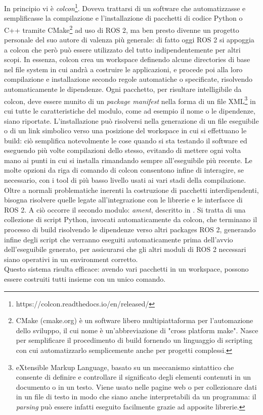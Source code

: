 In principio vi è \emph{colcon}\footnote{https://colcon.readthedocs.io/en/released/}. Doveva trattarsi di un software che automatizzasse e semplificasse la compilazione e l'installazione di pacchetti di codice Python o C++ tramite CMake\footnote{CMake (cmake.org) è un software libero multipiattaforma per l'automazione dello sviluppo, il cui nome è un'abbreviazione di "cross platform make". Nasce per semplificare il procedimento di build fornendo un linguaggio di scripting con cui automatizzarlo semplicemente anche per progetti complessi.} ad uso di ROS 2, ma ben presto divenne un progetto personale del suo autore di valenza più generale: di fatto oggi ROS 2 si appoggia a colcon che però può essere utilizzato del tutto indipendentemente per altri scopi. In essenza, colcon crea un workspace definendo alcune directories di base nel file system in cui andrà a costruire le applicazioni, e procede poi alla loro compilazione e installazione secondo regole automatiche o specificate, risolvendo automaticamente le dipendenze. Ogni pacchetto, per risultare intelligibile da colcon, deve essere munito di un \emph{package manifest} nella forma di un file XML\footnote{eXtensible Markup Language, basato su un meccanismo sintattico che consente di definire e controllare il significato degli elementi contenuti in un documento o in un testo. Viene usato nelle pagine web o per collezionare dati in un file di testo in modo che siano anche interpretabili da un programma: il \emph{parsing} può essere infatti eseguito facilmente grazie ad apposite librerie.} in cui tutte le caratteristiche del modulo, come ad esempio il nome o le dipendenze, siano riportate. L'installazione può risolversi nella generazione di un file eseguibile o di un link simbolico verso una posizione del workspace in cui si effettuano le build: ciò semplifica notevolmente le cose quando si sta testando il software ed eseguendo più volte compilazioni dello stesso, evitando di mettere ogni volta mano ai punti in cui si installa rimandando sempre all'eseguibile più recente. Le molte opzioni da riga di comando di colcon consentono infine di interagire, se necessario, con i tool di più basso livello usati ai vari stadi della compilazione.\\
Oltre a normali problematiche inerenti la costruzione di pacchetti interdipendenti, bisogna risolvere quelle legate all'integrazione con le librerie e le interfacce di ROS 2. A ciò occorre il secondo modulo: \emph{ament}, descritto in \cite{ros2_ament}. Si tratta di una collezione di script Python, invocati automaticamente da colcon, che terminano il processo di build risolvendo le dipendenze verso altri packages ROS 2, generando infine degli script che verranno eseguiti automaticamente prima dell'avvio dell'eseguibile generato, per assicurarsi che gli altri moduli di ROS 2 necessari siano operativi in un environment corretto.\\
Questo sistema risulta efficace: avendo vari pacchetti in un workspace, possono essere costruiti tutti insieme con un unico comando.\vfill\newpage

